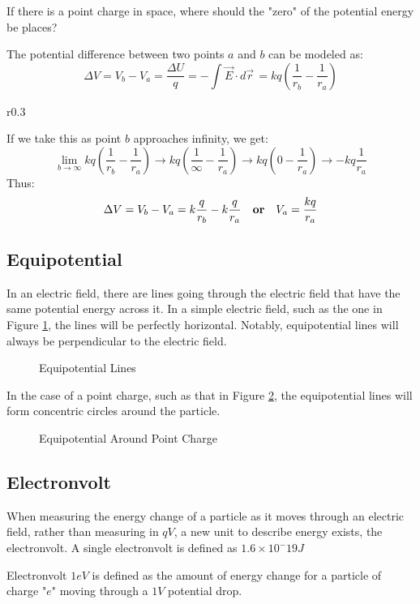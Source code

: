 \documentclass[12pt]{article}
\begin{document}
If there is a point charge in space, where should the "zero" of the potential energy be places?

The potential difference between two points $a$ and $b$ can be modeled as:
\begin{equation*}
  \Delta V = V_b - V_a = \frac{\Delta U}{q} = -\int_{}^{} \overrightarrow{E} \cdot d \overrightarrow{r} \, = kq \left(\frac{1}{r_b} - \frac{1}{r_a}\right)
\end{equation*}
\begin{wrapfigure}[]{r}{0.3\textwidth}
  \centering
  
  \caption{Point charge in space}
  \label{fig:019}
\end{wrapfigure}
If we take this as point $b$ approaches infinity, we get:
\begin{equation*}
  \lim_{b \to \infty} kq \left(\frac{1}{r_b} - \frac{1}{r_a}\right) \rightarrow kq\left(\frac{1}{\infty} - \frac{1}{r_a}\right) \rightarrow kq\left(0 - \frac{1}{r_a}\right) \rightarrow -kq\frac{1}{r_a}
\end{equation*}
Thus:
\begin{equation*}
  \Delta V = V_b - V_a = k\frac{q}{r_b}-k\frac{q}{r_a} \textup{\ \ \ \textbf{or}\ \ \ } V_a = \frac{kq}{r_a}
\end{equation*}

\subsection{Equipotential}
\label{ssec:equipotential}

In an electric field, there are lines going through the electric field that have the same
potential energy across it. In a simple electric field, such as the one in Figure \ref{fig:020},
the lines will be perfectly horizontal. Notably, equipotential lines will always be perpendicular to the electric field.
\begin{figure}[H]
  \centering
  
  \caption{Equipotential Lines}
  \label{fig:020}
\end{figure}
In the case of a point charge, such as that in Figure \ref{fig:021}, the equipotential lines
will form concentric circles around the particle.
\begin{figure}[H]
  \centering
  
  \caption{Equipotential Around Point Charge}
  \label{fig:021}
\end{figure}

\subsection{Electronvolt}
\label{ss3c:electronvolt}

When measuring the energy change of a particle as it moves through an electric field, rather
than measuring in $qV$, a new unit to describe energy exists, the electronvolt. A single
electronvolt is defined as $1.6 \times 10^-{19} J$

\begin{definition}{Electronvolt}
  $1 eV$ is defined as the amount of energy change for a particle of charge "$e$" moving 
  through a $1V$ potential drop.
\end{definition}
\end{document}
